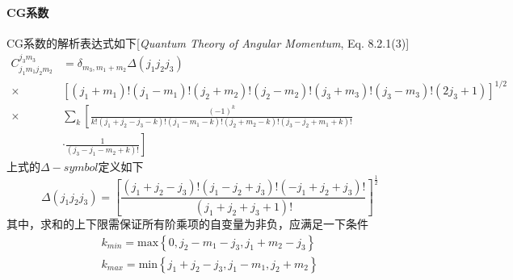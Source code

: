 \paragraph*{CG系数} CG系数的解析表达式如下[\textit{Quantum Theory of Angular Momentum}, Eq. 8.2.1(3)]
\begin{equation}
    \begin{aligned}
        C_{j_1 m_1 j_2 m_2}^{j_3 m_3} 
        &= \delta_{m_3, m_1 + m_2} \Delta(j_1 j_2 j_3) \\
        \times& \left[ (j_1 + m_1)! (j_1 - m_1)! (j_2 + m_2)! (j_2 - m_2)! 
                 (j_3 + m_3)! (j_3 - m_3)!(2j_3 + 1)\right]^{1/2} \\
            \times& \sum_{k}\left[\frac{(-1)^k}{k!(j_1 + j_2 - j_3 - k)!(j_1 - m_1 - k)!
            (j_2 + m_2 - k)!(j_3 - j_2 + m_1 +k)!}\right.\\
                  &\left. \cdot \frac{1}{(j_3 - j_1 - m_2 + k)!} \right]
    \end{aligned}
    \label{eq:CG-representations}
\end{equation}
上式的$\Delta-symbol$定义如下
\begin{equation*}
    \Delta(j_1 j_2 j_3) = \left[ \frac{(j_1 + j_2 - j_3)! (j_1 - j_2 + j_3)! (-j_1 + j_2 + j_3)!}
                                      {(j_1 + j_2 + j_3 +1)!} \right]^{\frac{1}{2}}
\end{equation*}
其中，求和的上下限需保证所有阶乘项的自变量为非负，应满足一下条件
\begin{equation}
    \begin{aligned}
        k_{min} = \text{max} \left\{ 0, j_2 - m_1 - j_3, j_1 + m_2 - j_3 \right\}\\
        k_{max} = \text{min} \left\{ j_1 + j_2 - j_3, j_1 - m_1, j_2 + m_2 \right\}
    \end{aligned}
    \label{eq:CG-nonnegative}
\end{equation}



